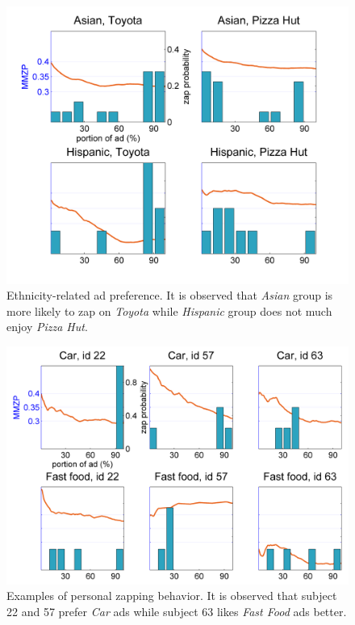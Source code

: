 \documentclass[twoside,leqno,twocolumn]{article}
\begin{document}
\begin{figure}[t]
	\centering
		\includegraphics[width=.9\columnwidth]{fig/eth_ad.png}
	\caption{Ethnicity-related ad preference. It is observed that \textit{Asian} group is more likely to zap on \textit{Toyota} while \textit{Hispanic} group does not much enjoy \textit{Pizza Hut}.}
	\label{fig:eth_ad}
\end{figure}

\begin{figure}[t]
	\centering
		\includegraphics[width=\columnwidth]{fig/adcat_id.png}
	\caption{Examples of personal zapping behavior. It is observed that subject 22 and 57 prefer \textit{Car} ads while subject 63 likes \textit{Fast Food} ads better.}
	\label{fig:adcat_id}
\end{figure}
\end{document}
